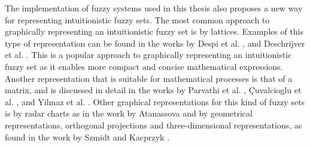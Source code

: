 The implementation of fuzzy systems used in this thesis also proposes a new way
for representing intuitionistic fuzzy sets. The most common approach to
graphically representing an intuitionistic fuzzy set is by lattices. Examples of
this type of representation can be found in the works by Despi et
al. \cite{Despi2013}, and Deschrijver et al. \cite{Deschrijver2004}. This is a
popular approach to graphically representing an intuitionistic fuzzy set as it
enables more compact and concise mathematical expressions. Another
representation that is suitable for mathematical processes is that of a matrix,
and is discussed in detail in the works by Parvathi et al. \cite{Parvathi2014},
Çuvalcioglu et al. \cite{Yilmaz2015}, and Yilmaz et
al. \cite{Yilmaz2015a}. Other graphical representations for this kind of fuzzy
sets is by radar charts as in the work by Atanassova \cite{Atanassova2010} and
by geometrical representations, orthogonal projections and three-dimensional
representations, as found in the work by Szmidt and Kacprzyk \cite{Szmidt2000}.
